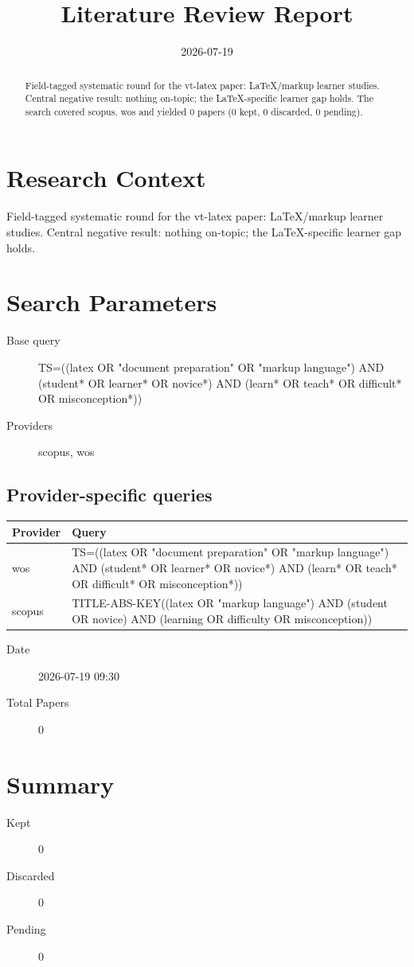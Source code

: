 \documentclass{article}
\title{Literature Review Report}
\date{2026-07-19}
\begin{document}
\maketitle

\begin{abstract}
Field-tagged systematic round for the vt-latex paper: LaTeX/markup learner studies. Central negative result: nothing on-topic; the LaTeX-specific learner gap holds. The search covered scopus, wos and yielded 0 papers (0 kept, 0 discarded, 0 pending).
\end{abstract}
\clearpage
\clearpage
\tableofcontents
\clearpage

\section{Research Context}
Field-tagged systematic round for the vt-latex paper: LaTeX/markup
learner studies. Central negative result: nothing on-topic; the
LaTeX-specific learner gap holds.

\section{Search Parameters}

\begin{description}
\item[Base query] TS=((latex OR "document preparation" OR "markup language") AND (student* OR learner* OR novice*) AND (learn* OR teach* OR difficult* OR misconception*))
\item[Providers] scopus, wos
\end{description}

\subsection{Provider-specific queries}
\begin{longtable}{lp{10cm}}
\toprule
Provider & Query \\
\midrule
wos & TS=((latex OR "document preparation" OR "markup language") AND (student* OR learner* OR novice*) AND (learn* OR teach* OR difficult* OR misconception*)) \\
scopus & TITLE-ABS-KEY((latex OR "markup language") AND (student OR novice) AND (learning OR difficulty OR misconception)) \\
\bottomrule
\end{longtable}

\begin{description}
\item[Date] 2026-07-19 09:30
\item[Total Papers] 0
\end{description}

\section{Summary}
\begin{description}
\item[Kept] 0
\item[Discarded] 0
\item[Pending] 0
\end{description}
\end{document}

